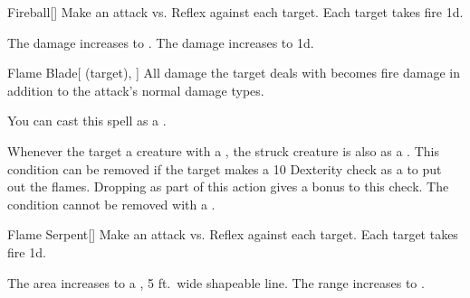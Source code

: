\lowercase{\hypertarget{spell:Fireball}{}}\label{spell:Fireball}
\begin{freeability}[Rank 3]{\hypertarget{spell:Fireball}{Fireball}}[]
Make an attack vs. Reflex against each target.
\hit Each target takes fire  \minus1d.

\rankline
{} The damage increases to .
 The damage increases to  \plus1d.
\end{freeability}
\vspace{0.25em}



\lowercase{\hypertarget{spell:Flame Blade}{}}\label{spell:Flame Blade}
\begin{attuneability}[Rank 3]{\hypertarget{spell:Flame Blade}{Flame Blade}}[ (target), ]
All damage the target deals with  becomes fire damage in addition to the attack's normal damage types.

You can cast this spell as a .

\rankline
{} Whenever the target  a creature with a , the struck creature is also  as a .
This condition can be removed if the target makes a  10 Dexterity check as a  to put out the flames.
Dropping  as part of this action gives a  bonus to this check.
 The condition cannot be removed with a .
\end{attuneability}
\vspace{0.25em}



\lowercase{\hypertarget{spell:Flame Serpent}{}}\label{spell:Flame Serpent}
\begin{freeability}[Rank 3]{\hypertarget{spell:Flame Serpent}{Flame Serpent}}[]
Make an attack vs. Reflex against each target.
\hit Each target takes fire  \minus1d.

\rankline
{} The area increases to a \arealarge, 5 ft.\ wide shapeable line.
 The range increases to \rngmed.
\end{freeability}
\vspace{0.25em}



